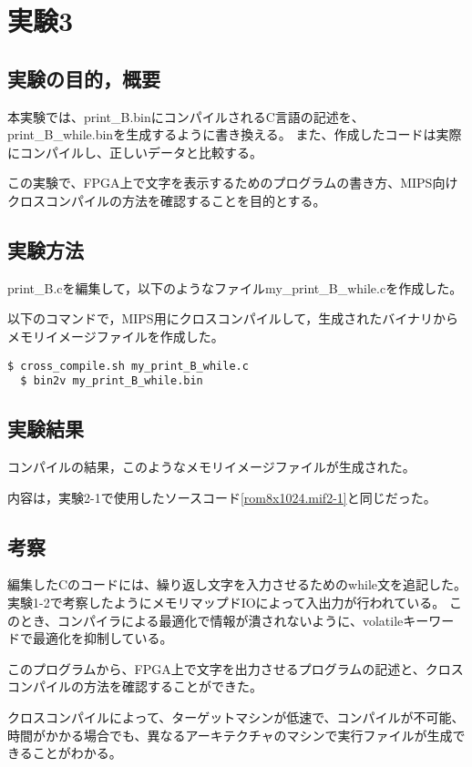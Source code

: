 \section{実験3}
\subsection{実験の目的，概要}
本実験では、print\_B.binにコンパイルされるC言語の記述を、print\_B\_while.binを生成するように書き換える。
また、作成したコードは実際にコンパイルし、正しいデータと比較する。

この実験で、FPGA上で文字を表示するためのプログラムの書き方、MIPS向けクロスコンパイルの方法を確認することを目的とする。

\subsection{実験方法}
print\_B.cを編集して，以下のようなファイルmy\_print\_B\_while.cを作成した。


以下のコマンドで，MIPS用にクロスコンパイルして，生成されたバイナリからメモリイメージファイルを作成した。

\begin{lstlisting}[caption={クロスコンパイル},label={クロスコンパイル}]
  $ cross_compile.sh my_print_B_while.c
  $ bin2v my_print_B_while.bin
\end{lstlisting}

\subsection{実験結果}
コンパイルの結果，このようなメモリイメージファイルが生成された。


内容は，実験2-1で使用したソースコード\ref{rom8x1024.mif2-1}と同じだった。

\subsection{考察}
編集したCのコードには、繰り返し文字を入力させるためのwhile文を追記した。
実験1-2で考察したようにメモリマップドIOによって入出力が行われている。
このとき、コンパイラによる最適化で情報が潰されないように、volatileキーワードで最適化を抑制している。

このプログラムから、FPGA上で文字を出力させるプログラムの記述と、クロスコンパイルの方法を確認することができた。

クロスコンパイルによって、ターゲットマシンが低速で、コンパイルが不可能、時間がかかる場合でも、異なるアーキテクチャのマシンで実行ファイルが生成できることがわかる。

